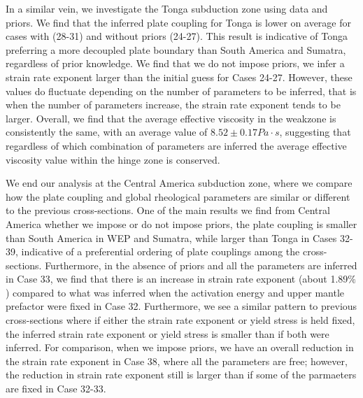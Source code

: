 \documentclass[12pt]{article}
\begin{document}
{In a similar vein, we investigate the Tonga subduction zone using data and priors. We find that the inferred plate coupling for Tonga is lower on average for cases with (28-31) and without priors (24-27). This result is indicative of Tonga preferring a more decoupled plate boundary than South America and Sumatra, regardless of prior knowledge. We find that we do not impose priors, we infer a strain rate exponent larger than the initial guess for Cases 24-27. However, these values  do fluctuate depending on the number of parameters to be inferred, that is when the number of parameters increase, the strain rate exponent tends to be larger. Overall, we find that the average effective viscosity in the weakzone is consistently the same, with an average value of $8.52 \pm 0.17 Pa \cdot s$, suggesting that regardless of which combination of parameters are inferred the average effective viscosity value within the hinge zone is conserved. 

We end our analysis at the Central America subduction zone, where we compare how the plate coupling and global rheological parameters are similar or different to the previous cross-sections. One of the main results we find from Central America whether we impose or do not impose priors, the plate coupling is smaller than South America in WEP and Sumatra, while larger than Tonga in Cases 32-39, indicative of a preferential ordering of plate couplings among the cross-sections. Furthermore, in the absence of priors and all the parameters are inferred in Case 33, we find that there is an increase in strain rate exponent (about 1.89$\%$) compared to what was inferred when the activation energy and upper mantle prefactor were fixed in Case 32. Furthermore, we see a similar pattern to previous cross-sections where if either the strain rate exponent or yield stress is held fixed, the inferred strain rate exponent or yield stress is smaller than if both were inferred. For comparison, when we impose priors, we have an overall reduction in the strain rate exponent in Case 38, where all the parameters are free; however, the reduction in strain rate exponent still is larger than if some of the parmaeters are fixed in Case 32-33.

}
\end{document}
